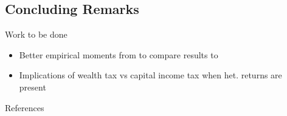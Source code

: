 \documentclass{beamer}
\begin{document}



\subsection{Concluding Remarks}


\begin{frame}{Work to be done}
  \begin{itemize}
\item Better empirical moments from \cite{aflgdmlp20} to compare results to
\item Implications of wealth tax vs capital income tax when het. returns are present \cite{Guvenen2023}
\end{itemize}
\end{frame}







\begin{frame}[allowframebreaks]{References}
  \printbibliography
\end{frame}
\end{document}
